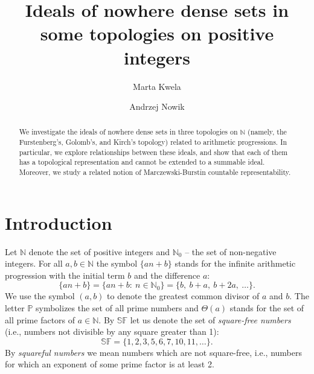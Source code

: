 \documentclass{amsart}
\title[Ideals of nowhere dense sets in some topologies on positive integers]{Ideals of nowhere dense sets in some topologies on positive integers}
\author{Marta Kwela}
\author{Andrzej Nowik}
\theoremstyle{definition}
\theoremstyle{definition}
\newcommand{\N}{{\mathbb N}}
\newcommand{\SqrFr}{\mathbb{SF}}
\newcommand{\finbw}{\text{FinBW}}
\begin{document}
\begin{abstract}
We investigate the ideals of nowhere dense sets in three topologies on $\N$ (namely, the Furstenberg's, Golomb's, and Kirch's topology) related to arithmetic progressions. In particular, we explore relationships between these ideals, and show that each of them has a topological representation and cannot be extended to a summable ideal. Moreover, we study a related notion of Marczewski-Burstin countable representability.
\end{abstract}
\maketitle






\section{Introduction}

Let $\N$ denote the set of positive integers and $\N_0$ -- the set of non-negative integers. For all $a,b\in\N$ the symbol $\{an+b\}$ stands for the infinite arithmetic progression with the initial term $b$ and the difference $a$:
$$\{an+b\} = \{an+b :\ n\in\N_0\} = \{b,\ b+a,\ b+2a,\ \ldots\}. $$
We use the symbol $(a,b)$ to denote the greatest common divisor of $a$ and $b$. 
The letter $\mathbb{P}$ symbolizes the set of all prime numbers and $\Theta(a)$ stands for the set of all prime factors of $a\in\N$.
By $\mathbb{SF}$ let us denote the set of \emph{square-free numbers} (i.e., numbers not divisible by any square greater than 1):
$$\SqrFr = \{1,2,3,5,6,7,10,11,\ldots\}.$$
By \emph{squareful numbers} we mean numbers which are not square-free, i.e., numbers for which an exponent of some prime factor is at least 2.
\end{document}

